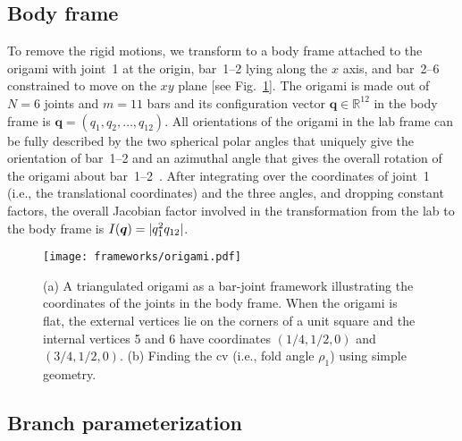 \subsection{Body frame}

To remove the rigid motions, we transform to a body frame attached to the origami with joint~1 at the origin, bar~1--2 lying along the $x$ axis, and bar~2--6 constrained to move on the $xy$ plane [see Fig.~\ref{fig:origami}].
The origami is made out of $N = 6$ joints and $m = 11$ bars and its configuration vector $\bm{q} \in \mathbb{R}^{12}$ in the body frame is $\bm{q} = (q_{1}, q_{2}, \ldots, q_{12})$.
All orientations of the origami in the lab frame can be fully described by the two spherical polar angles that uniquely give the orientation of bar~1--2 and an azimuthal angle that gives the overall rotation of the origami about bar~1--2~\cite{herschbach1959}.
After integrating over the coordinates of joint~1 (i.e., the translational coordinates) and the three angles, and dropping constant factors, the overall Jacobian factor involved in the transformation from the lab to the body frame is $I(\bm{q}) = \lvert q_1^2 q_{12}\rvert$.
%
\begin{figure}
  \begin{center}
    \texttt{[image: frameworks/origami.pdf]}
  \end{center}
  \caption{(a) A triangulated origami as a bar-joint framework illustrating the coordinates of the joints in the body frame. When the origami is flat, the external vertices lie on the corners of a unit square and the internal vertices 5 and 6 have coordinates $(1/4,1/2,0)$ and $(3/4,1/2,0)$. (b) Finding the \ac{cv} (i.e., fold angle $\rho_{1}$) using simple geometry.}
  \label{fig:origami}
\end{figure}

\subsection{Branch parameterization}

